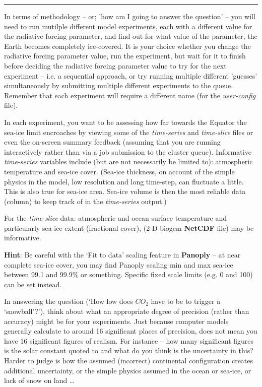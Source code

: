 \vspace{1mm}\noindent\rule{4cm}{0.5pt}\vspace{2mm}

\noindent In terms of methodology -- or; 'how am I going to answer the question' -- you will need to run mutilple different model experiments, each with a different value for the radiative forcing parameter, and find out for what value of the parameter, the Earth becomes completely ice-covered. It is your choice whether you change the radiative forcing parameter value, run the experiment, but wait for it to finish before deciding the radiative forcing parameter value to try for the next experiment -- i.e. a sequential approach, or try running multiple different 'guesses' simultaneously by submitting multiple different experiments to the queue. Remember that each experiment will require a different name (for the \textit{user-config} file).

In each experiment, you want to be assessing how far towards the Equator the sea-ice limit encroaches by viewing some of the \textit{time-series} and \textit{time-slice} files or even the on-screen summary feedback (assuming that you are running interactively rather than via a job submission to the cluster queue). Informative \textit{time-series} variables include (but are not necessarily be limited to): atmospheric temperature and sea-ice cover. (Sea-ice thickness, on account of the simple physics in the model, low resolution and long time-step, can fluctuate a little. This is also true for sea-ice area. Sea-ice volume is then the most reliable data (column) to keep track of in the \textit{time-series} output.)

For the \textit{time-slice} data: atmospheric and ocean surface temperature and particularly sea-ice extent (fractional cover), (2-D biogem \textbf{NetCDF} file) may be informative.

\textbf{Hint}: Be careful with the ‘\textsf{\footnotesize Fit to data}’ scaling feature in \textbf{Panoply} – at near complete sea-ice cover, you may find Panoply scaling min and max sea-ice between 99.1 and 99.9\% or something. Specific fixed scale limits (e.g. 0 and 100) can be set instead.

In answering the question (‘How low does \(CO_{2}\) have to be to trigger a ‘snowball’?’), think about what an appropriate degree of precision (rather than accuracy) might be for your experiments. Just because computer models generally calculate to around 16 significant places of precision, does not mean you have 16 significant figures of realism. For instance – how many significant figures is the solar constant quoted to and what do you think is the uncertainty in this? Harder to judge is how the assumed (incorrect) continental configuration creates additional uncertainty, or the simple physics assumed in the ocean or sea-ice, or lack of snow on land …

